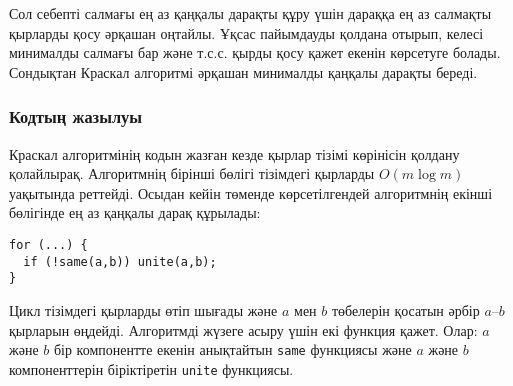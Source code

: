 \begin{center}
\end{center}

Сол себепті салмағы ең аз қаңқалы дарақты құру үшін
дараққа ең аз салмақты қырларды қосу әрқашан оңтайлы.
Ұқсас пайымдауды қолдана отырып,   келесі минималды салмағы бар және т.с.с. қырды қосу қажет екенін көрсетуге болады. Сондықтан Краскал алгоритмі әрқашан минималды қаңқалы дарақты береді.

\subsubsection{Кодтың жазылуы}

Краскал алгоритмінің кодын жазған кезде қырлар тізімі
көрінісін қолдану қолайлырақ. Алгоритмнің бірінші 
бөлігі тізімдегі қырларды $O(m \log m)$ уақытында реттейді.
Осыдан кейін төменде көрсетілгендей алгоритмнің екінші бөлігінде 
ең аз қаңқалы дарақ құрылады:

\begin{lstlisting}
for (...) {
  if (!same(a,b)) unite(a,b);
}
\end{lstlisting}

Цикл тізімдегі қырларды өтіп шығады және $a$ мен $b$ төбелерін қосатын әрбір $a$--$b$
қырларын өңдейді.
Алгоритмді жүзеге асыру үшін екі 
функция қажет. Олар: $a$ және 
$b$ бір компонентте екенін анықтайтын \texttt{same} функциясы және $a$ және $b$ компоненттерін біріктіретін \texttt{unite}
функциясы.

